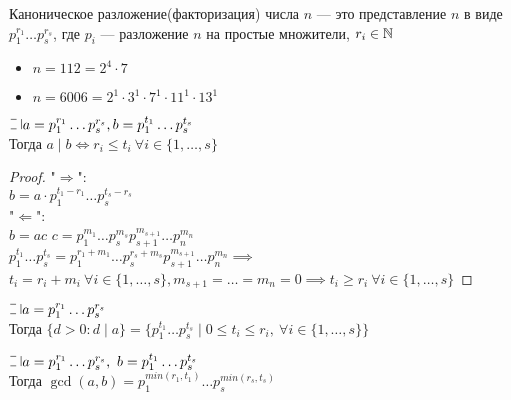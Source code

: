 \begin{normalsize}
\begin{defn}
    Каноническое разложение(факторизация) числа $n$ --- это представление $n$ в виде $p_1^{r_1} \ldots p_s^{r_s}$, где $p_i$ --- разложение $n$ на простые множители, $r_i \in \mathbb{N}$
\end{defn}

\begin{examples}
    \begin{itemize}
        \item $n = 112 = 2^4 \cdot 7$
        \item $n = 6006 = 2^1 \cdot 3^1 \cdot 7^1 \cdot 11^1 \cdot 13^1$
    \end{itemize}
\end{examples}

\begin{theorem-non}
    $\letus a = p_1^{r_1} \ldots p_s^{r_s}, b = p_1^{t_1} \ldots p_s^{t_s}$\\
    Тогда $a \mid b \iff r_i \leq t_i~\forall i \in \{1, \ldots, s\}$
\end{theorem-non}

\begin{proof}
    "$\Rightarrow$":\\
    $b = a \cdot p_1^{t_1 - r_1} \ldots p_s^{t_s - r_s}$\\
    "$\Leftarrow$":\\
    $b = ac$ $c = p_1^{m_1} \ldots p_s^{m_s} p_{s+1}^{m_{s+1}} \ldots p_n^{m_n}$\\
    $p_1^{t_1} \ldots p_s^{t_s} = p_1^{r_1 + m_1} \ldots p_s^{r_s + m_s} p_{s+1}^{m_{s+1}} \ldots p_n^{m_n} \implies$\\
    $t_i = r_i + m_i~\forall i \in \{1, \ldots, s\}, m_{s+1} = \ldots = m_n = 0 \implies t_i \geq r_i~\forall i \in \{1, \ldots, s\}$
\end{proof}

\begin{follow}
    $\letus a = p_1^{r_1} \ldots p_s^{r_s}$\\
    Тогда $\{d > 0 : d \mid a\} = \{p_1^{t_1} \ldots p_s^{t_s} \mid 0 \leq t_i \leq r_i,~\forall i \in \{1, \ldots, s\}\}$
\end{follow}

\begin{follow}
    $\letus a = p_1^{r_1} \ldots p_s^{r_s},~b = p_1^{t_1} \ldots p_s^{t_s}$\\
    Тогда $\gcd(a, b) = p_1^{min(r_1, t_1)} \ldots p_s^{min(r_s, t_s)}$
\end{follow}


\end{normalsize}
